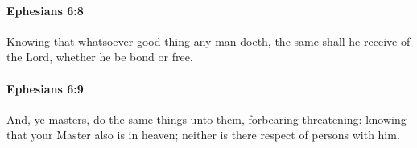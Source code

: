 		\paragraph{Ephesians 6:8} %
			\label{EPHESIANS-6-8}

			Knowing that whatsoever good thing any man doeth, the same shall he receive of the Lord, whether he be bond or free.

			\begin{framed}
			\scriptsize
				\begin{compactdesc}
					\item[SBLG] 
				\end{compactdesc}
			\end{framed}

		\paragraph{Ephesians 6:9} %
			\label{EPHESIANS-6-9}

			And, ye masters, do the same things unto them, forbearing threatening: knowing that your Master also is in heaven; neither is there respect of persons with him.

